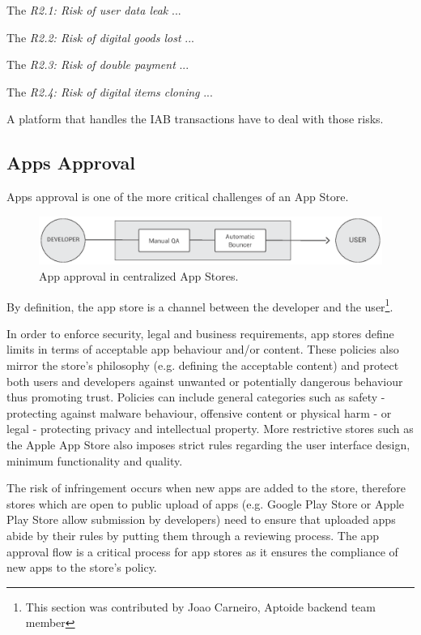 The {\em R2.1: Risk of user data leak} ...

The {\em R2.2: Risk of digital goods lost} ...

The {\em R2.3: Risk of double payment} ...

The {\em R2.4: Risk of digital items cloning} ...

A platform that handles the IAB transactions have to deal with those risks.


\subsection{Apps Approval}


Apps approval is one of the more critical challenges of an App Store.

\begin{figure}[!ht]
\centering
\includegraphics[width=\textwidth]{diagrams/apps_approval_flow.eps}
\caption{App approval in centralized App Stores.}
\label{fig:app_approval_flow}
\end{figure}


By definition, the app store is a channel between the developer and the user\footnote{This section was contributed by Joao Carneiro, Aptoide backend team member}.

In order to enforce security, legal and business requirements, app stores define limits in terms of acceptable app behaviour and/or content. These policies also mirror the store's philosophy (e.g. defining the acceptable content) and protect both users and developers against unwanted or potentially dangerous behaviour thus promoting trust. Policies can include general categories such as safety - protecting against malware behaviour, offensive content or physical harm - or legal - protecting privacy and intellectual property. More restrictive stores such as the Apple App Store also imposes strict rules regarding the user interface design, minimum functionality and quality. \cite{GooglePolicyWebsite} \cite{ApplePolicyWebsite}

The risk of infringement occurs when new apps are added to the store, therefore stores which are open to public upload of apps (e.g. Google Play Store or Apple Play Store allow submission by developers) need to ensure that uploaded apps abide by their rules by putting them through a reviewing process. The app approval flow is a critical process for app stores as it ensures the compliance of new apps to the store's policy.

